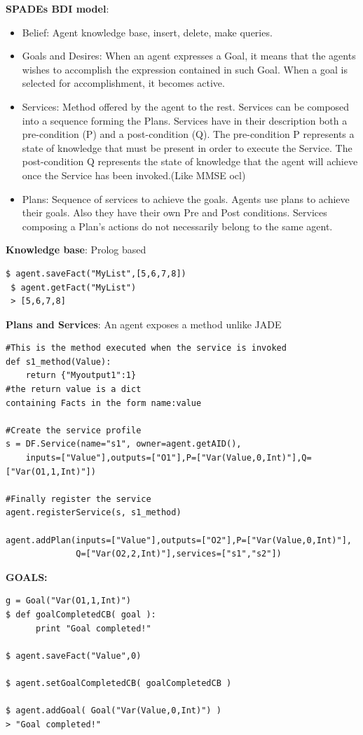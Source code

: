\documentclass[a4paper, 11pt]{article}
\begin{document}
\noindent \textbf{SPADEs BDI model}:
\begin{itemize}
	\item Belief: Agent knowledge base, insert, delete, make queries.
	\item Goals and Desires: When an agent expresses a Goal, it means that the agents wishes to accomplish the expression contained in such Goal. When a goal is selected for accomplishment, it becomes active.
	\item Services: Method offered by the agent to the rest. Services can be composed into a sequence forming the Plans. Services have in their description both a pre-condition (P) and a post-condition (Q). The pre-condition P represents a state of knowledge that must be present in order to execute the Service. The post-condition Q represents the state of knowledge that the agent will achieve once the Service has been invoked.(Like MMSE ocl)
	\item Plans: Sequence of services to achieve the goals. Agents use plans to achieve their goals. Also they have their own Pre and Post conditions. Services composing a Plan's actions do not necessarily belong to the same agent.
\end{itemize}

\noindent \textbf{Knowledge base}: Prolog based \\
\begin{Verbatim}[xleftmargin=.2in]
 $ agent.saveFact("MyList",[5,6,7,8])
 $ agent.getFact("MyList")
 > [5,6,7,8]
\end{Verbatim}

\noindent \textbf{Plans and Services}: An agent exposes a method unlike JADE \\
\begin{Verbatim}[xleftmargin=.2in]
#This is the method executed when the service is invoked
def s1_method(Value):
    return {"Myoutput1":1} 
#the return value is a dict 
containing Facts in the form name:value

#Create the service profile
s = DF.Service(name="s1", owner=agent.getAID(),
    inputs=["Value"],outputs=["O1"],P=["Var(Value,0,Int)"],Q=["Var(O1,1,Int)"])

#Finally register the service
agent.registerService(s, s1_method)

agent.addPlan(inputs=["Value"],outputs=["O2"],P=["Var(Value,0,Int)"],
			  Q=["Var(O2,2,Int)"],services=["s1","s2"])
\end{Verbatim}

\noindent \textbf{GOALS:} \\
\begin{Verbatim}[xleftmargin=.2in]
g = Goal("Var(O1,1,Int)")
$ def goalCompletedCB( goal ):
      print "Goal completed!"

$ agent.saveFact("Value",0)

$ agent.setGoalCompletedCB( goalCompletedCB )

$ agent.addGoal( Goal("Var(Value,0,Int)") )
> "Goal completed!"
\end{Verbatim}
\end{document}
